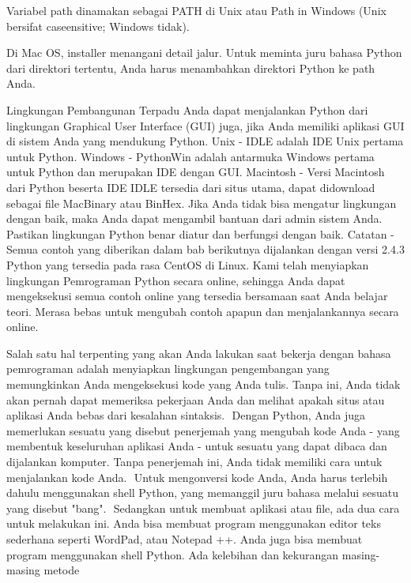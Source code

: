 {{{\vspace{14pt}
\noindent 
{\fontsize{14pt}{14pt}\selectfont Variabel path dinamakan sebagai PATH di Unix atau Path in Windows (Unix bersifat caseensitive; Windows tidak). \\} \par
\vspace{14pt}
\noindent 
{\fontsize{14pt}{14pt}\selectfont Di Mac OS, installer menangani detail jalur. Untuk meminta juru bahasa Python dari direktori tertentu, Anda harus menambahkan direktori Python ke path Anda. \\} \par
\vspace{14pt}
\noindent 
{\fontsize{14pt}{14pt}\selectfont \vspace{\baselineskip}
Lingkungan Pembangunan Terpadu Anda dapat menjalankan Python dari lingkungan Graphical User Interface (GUI) juga, jika Anda memiliki aplikasi GUI di sistem Anda yang mendukung Python. Unix - IDLE adalah IDE Unix pertama untuk Python. Windows - PythonWin adalah antarmuka Windows pertama untuk Python dan merupakan IDE dengan GUI. Macintosh - Versi Macintosh dari Python beserta IDE IDLE tersedia dari situs utama, dapat didownload sebagai file MacBinary atau BinHex. Jika Anda tidak bisa mengatur lingkungan dengan baik, maka Anda dapat mengambil bantuan dari admin sistem Anda. Pastikan lingkungan Python benar diatur dan berfungsi dengan baik. Catatan - Semua contoh yang diberikan dalam bab berikutnya dijalankan dengan versi 2.4.3 Python yang tersedia pada rasa CentOS di Linux. Kami telah menyiapkan lingkungan Pemrograman Python secara online, sehingga Anda dapat mengeksekusi semua contoh online yang tersedia bersamaan saat Anda belajar teori. Merasa bebas untuk mengubah contoh apapun dan menjalankannya secara online. \\} \par
\vspace{14pt}
\noindent 
{\fontsize{14pt}{14pt}\selectfont \vspace{\baselineskip}
Salah satu hal terpenting yang akan Anda lakukan saat bekerja dengan bahasa pemrograman adalah menyiapkan lingkungan pengembangan yang memungkinkan Anda mengeksekusi kode yang Anda tulis. Tanpa ini, Anda tidak akan pernah dapat memeriksa pekerjaan Anda dan melihat apakah situs atau aplikasi Anda bebas dari kesalahan sintaksis.  $  $ Dengan Python, Anda juga memerlukan sesuatu yang disebut penerjemah yang mengubah kode Anda - yang membentuk keseluruhan aplikasi Anda - untuk sesuatu yang dapat dibaca dan dijalankan komputer. Tanpa penerjemah ini, Anda tidak memiliki cara untuk menjalankan kode Anda.  $  $ Untuk mengonversi kode Anda, Anda harus terlebih dahulu menggunakan shell Python, yang memanggil juru bahasa melalui sesuatu yang disebut "bang".  $  $ Sedangkan untuk membuat aplikasi atau file, ada dua cara untuk melakukan ini. Anda bisa membuat program menggunakan editor teks sederhana seperti WordPad, atau Notepad ++. Anda juga bisa membuat program menggunakan shell Python. Ada kelebihan dan kekurangan masing-masing metode \\} \par
}}}
